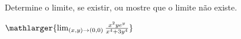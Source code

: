 Determine o limite, se existir, ou mostre que o limite não existe.

$\mathlarger{\lim_{(x,y)\rightarrow(0,0)} \frac{x^2ye^y}{x^4+3y^4}}$
